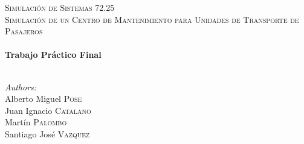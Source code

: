 \begin{titlepage}

\begin{center}




\textsc{\LARGE Simulación de Sistemas 72.25}\\[1.5cm]

\textsc{\Large Simulación de un Centro de Mantenimiento para Unidades de Transporte de Pasajeros}\\[0.5cm]


\HRule \\[0.4cm]
{ \huge \bfseries Trabajo Práctico Final}\\[0.4cm]

\HRule \\[1.5cm]

\begin{minipage}{0.4\textwidth}
\begin{flushleft} \large
\emph{Authors:}\\
Alberto Miguel \textsc{Pose}\\
Juan Ignacio \textsc{Catalano}\\
Martín \textsc{Palombo}\\
Santiago José \textsc{Vazquez}\\
\end{flushleft}
\end{minipage}

\vfill

\end{center}
\thispagestyle{empty}
\end{titlepage}
